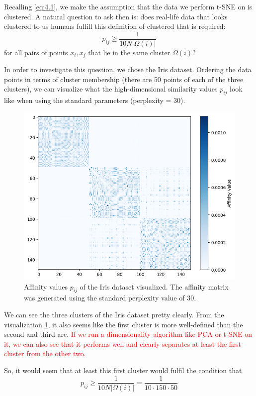 Recalling \ref{eq:4.1}, we make the assumption that the data we perform t-SNE on is clustered. 
A natural question to ask then is: does real-life data that looks clustered to us humans fulfill this definition of clustered that is required: 
\begin{equation}
    p_{ij} \geq \frac{1}{10 N |\Omega(i)|}
\end{equation}
for all pairs of points $x_i, x_j$ that lie in the same cluster $\Omega(i)$? 

In order to investigate this question, we chose the Iris dataset. 
Ordering the data points in terms of cluster membership (there are 50 points of each of the three clusters), we can visualize what the high-dimensional similarity values $p_{ij}$ look like when using the standard parameters (perplexity = 30). 

\begin{figure}[h]
    \centering 
        \includegraphics[width=0.7\linewidth]{figures/iris_affinity_matrix.png}
        \caption{Affinity values $p_{ij}$ of the Iris dataset visualized. The affinity matrix was generated using the standard perplexity value of 30.}
    \label{fig:iris_affinities}
\end{figure}

We can see the three clusters of the Iris dataset pretty clearly. 
From the visualization \ref{fig:iris_affinities}, it also seems like the first cluster is more well-defined than the second and third are. 
\textcolor{red}{If we run a dimensionality algorithm like PCA or t-SNE on it, we can also see that it performs well and clearly separates at least the first cluster from the other two.} 

So, it would seem that at least this first cluster would fulfil the condition that \begin{equation} p_{ij} \geq \frac{1}{10 N |\Omega(i)|} = \frac{1}{10 \cdot 150 \cdot 50} \end{equation}

